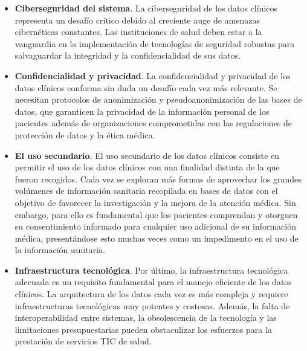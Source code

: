\begin{itemize}

    \item \textbf{Ciberseguridad del sistema}. La ciberseguridad de los datos clínicos representa un desafío crítico debido al creciente auge de amenazas cibernéticas constantes. Las instituciones de salud deben estar a la vanguardia en la implementación de tecnologías de seguridad robustas para salvaguardar la integridad y la confidencialidad de sus datos.
    
    \item \textbf{Confidencialidad y privacidad}.   La confidencialidad y privacidad de los datos clínicos conforma sin duda un desafío cada vez más relevante. %
    Se necesitan protocolos de anonimización y pseudoanonimización de las bases de datos, que garanticen la privacidad de la información personal de los pacientes además de organizaciones comprometidas con las regulaciones de protección de datos y la ética médica.
    
    \item \textbf{El uso secundario}. El uso secundario de los datos clínicos consiste en permitir el uso de los datos clínicos con una finalidad distinta de la que fueron recogidos. Cada vez se exploran más formas de aprovechar los grandes volúmenes de información sanitaria recopilada en bases de datos con el objetivo de favorecer la investigación y la mejora de la atención médica. Sin embargo, para ello es fundamental que los pacientes comprendan y otorguen su consentimiento informado para cualquier uso adicional de su información médica, presentándose esto muchas veces como un impedimento en el uso de la información sanitaria.
    
    \item \textbf{Infraestructura tecnológica}. Por último, la infraestructura tecnológica adecuada es un requisito fundamental para el manejo eficiente de los datos clínicos. La arquitectura de los datos cada vez es más compleja y requiere infraestructuras tecnológicas muy potentes y costosas. Además, la falta de interoperabilidad entre sistemas, la obsolescencia de la tecnología y las limitaciones presupuestarias pueden obstaculizar los esfuerzos para la prestación de servicios TIC de salud.
    
\end{itemize}

